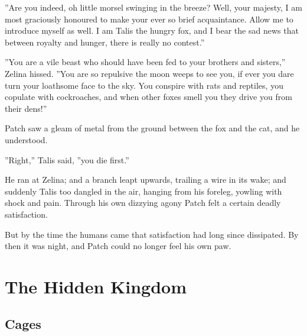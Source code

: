\documentclass[12pt]{book}
\begin{document}
''Are you indeed, oh little morsel swinging in the breeze? Well, your majesty, I am most graciously honoured to make your ever so brief acquaintance. Allow me to introduce myself as well. I am Talis the hungry fox, and I bear the sad news that between royalty and hunger, there is really no contest.''\par
''You are a vile beast who should have been fed to your brothers and sisters,'' Zelina hissed. ''You are so repulsive the moon weeps to see you, if ever you dare turn your loathsome face to the sky. You conspire with rats and reptiles, you copulate with cockroaches, and when other foxes smell you they drive you from their dens!''\par
Patch saw a gleam of metal from the ground between the fox and the cat, and he understood.\par
''Right,'' Talis said, ''you die first.''\par
He ran at Zelina; and a branch leapt upwards, trailing a wire in its wake; and suddenly Talis too dangled in the air, hanging from his foreleg, yowling with shock and pain. Through his own dizzying agony Patch felt a certain deadly satisfaction.\par
But by the time the humans came that satisfaction had long since dissipated. By then it was night, and Patch could no longer feel his own paw.\par

\chapter{The Hidden Kingdom}


\section{Cages}
\end{document}
